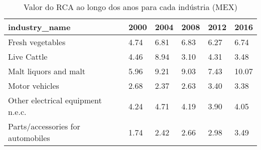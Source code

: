 \begin{table}
\centering
\caption{Valor do RCA ao longo dos anos para cada indústria (MEX)}
\begin{tabular}{p{6cm}p{1.5cm}p{1.5cm}p{1.5cm}p{1.5cm}p{1.5cm}}
\toprule
                    industry\_name & 2000 & 2004 & 2008 & 2012 &  2016 \\
\midrule
                 Fresh vegetables & 4.74 & 6.81 & 6.83 & 6.27 &  6.74 \\
                      Live Cattle & 4.46 & 8.94 & 3.10 & 4.31 &  3.48 \\
            Malt liquors and malt & 5.96 & 9.21 & 9.03 & 7.43 & 10.07 \\
                   Motor vehicles & 2.68 & 2.37 & 2.63 & 3.40 &  3.38 \\
Other electrical equipment n.e.c. & 4.24 & 4.71 & 4.19 & 3.90 &  4.05 \\
Parts/accessories for automobiles & 1.74 & 2.42 & 2.66 & 2.98 &  3.49 \\
\bottomrule
\end{tabular}
\end{table}
